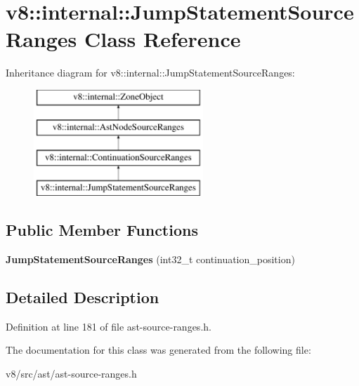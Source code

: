 \hypertarget{classv8_1_1internal_1_1JumpStatementSourceRanges}{}\section{v8\+:\+:internal\+:\+:Jump\+Statement\+Source\+Ranges Class Reference}
\label{classv8_1_1internal_1_1JumpStatementSourceRanges}
Inheritance diagram for v8\+:\+:internal\+:\+:Jump\+Statement\+Source\+Ranges\+:\begin{figure}[H]
\begin{center}
\leavevmode
\includegraphics[height=4.000000cm]{classv8_1_1internal_1_1JumpStatementSourceRanges}
\end{center}
\end{figure}
\subsection*{Public Member Functions}
\begin{DoxyCompactItemize}
\item 
\mbox{\label{classv8_1_1internal_1_1JumpStatementSourceRanges_ab781478b5d384935eda44bf9a98bb11b}} 
{\bfseries Jump\+Statement\+Source\+Ranges} (int32\+\_\+t continuation\+\_\+position)
\end{DoxyCompactItemize}


\subsection{Detailed Description}


Definition at line 181 of file ast-\/source-\/ranges.\+h.



The documentation for this class was generated from the following file\+:\begin{DoxyCompactItemize}
\item 
v8/src/ast/ast-\/source-\/ranges.\+h\end{DoxyCompactItemize}
